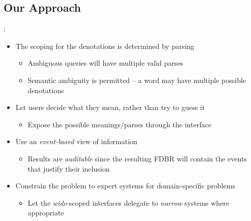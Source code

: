 \documentclass[logoontitle,tabu,supertabular,aspectratio=43]{preney-uwindsor-beamer}
\begin{document}
    \subsection{Our Approach}
    \begin{frame}{\insertsection: \insertsubsection}
        \begin{itemize}
            \item The scoping for the denotations is determined by parsing
            \begin{itemize}
                \item Ambiguous queries will have multiple valid parses
                \item Semantic ambiguity is permitted -- a word may have multiple possible denotations
            \end{itemize}
            \item Let users decide what they mean, rather than try to guess it
            \begin{itemize}
                \item Expose the possible meanings/parses through the interface
            \end{itemize}
            \item Use an {\em event-based} view of information \cite{frost:eswcposter2014}
            \begin{itemize}
                \item Results are {\em auditable} since the resulting FDBR will contain the events that justify their inclusion
            \end{itemize}
            \item Constrain the problem to expert systems for domain-specific problems
            \begin{itemize}
                \item Let the {\em wide}-scoped interfaces delegate to {\em narrow} systems where appropriate
            \end{itemize}
        \end{itemize}
    \end{frame}

\end{document}
